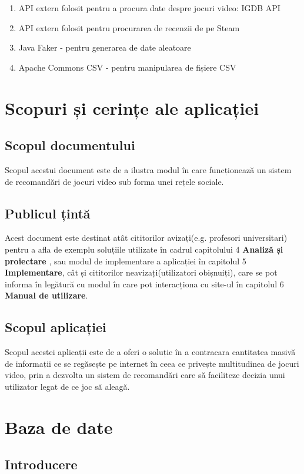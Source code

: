\documentclass[12pt,a4paper]{report}
\begin{document}
\begin{enumerate}
  \item API extern folosit pentru a procura date despre jocuri video: IGDB API \cite{1}
  \item API extern folosit pentru procurarea de recenzii de pe Steam \cite{2}
  \item Java Faker - pentru generarea de date aleatoare \cite{3}
  \item Apache Commons CSV - pentru manipularea de fișiere CSV \cite{4}
\end{enumerate}


\section{Scopuri și cerințe ale aplicației}
\subsection{Scopul documentului}
Scopul acestui document este de a ilustra modul în care funcționează un sistem de recomandări de jocuri video sub forma unei rețele sociale.
\subsection{Publicul țintă}
Acest document este destinat atât cititorilor avizați(e.g. profesori universitari) pentru a afla de exemplu soluțiile utilizate în cadrul capitolului 4 \textbf{Analiză și proiectare} , sau modul de implementare a aplicației în capitolul 5 \textbf{Implementare}, cât și cititorilor neavizați(utilizatori obișnuiți), care se pot informa în legătură cu modul în care pot interacționa cu site-ul în capitolul 6 \textbf{Manual de utilizare}.
\subsection{Scopul aplicației}
Scopul acestei aplicații este de a oferi o soluție în a contracara cantitatea masivă de informații ce se regăsește pe internet \cite{5} în ceea ce privește multitudinea de jocuri video, prin a dezvolta un sistem de recomandări care să faciliteze decizia unui utilizator legat de ce joc să aleagă.  




\section{Baza de date}
\subsection{Introducere}
\end{document}

